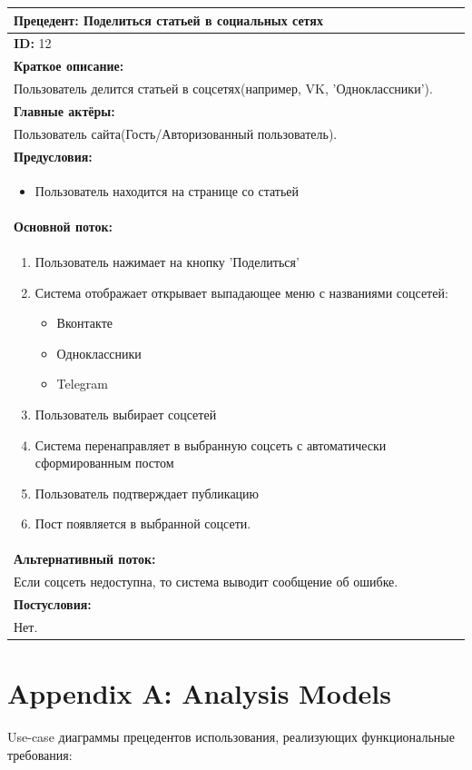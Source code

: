 \documentclass{scrreprt}
\begin{document}
\vspace{10px}
\noindent
\begin{tabularx}{\textwidth}{|X|}
	\hline
	\textbf{Прецедент: Поделиться статьей в социальных сетях} \\
	\hline
	\textbf{ID:} 12 \\
	\hline
	\textbf{Краткое описание:} \\
	Пользователь делится статьей в соцсетях(например, VK, 'Одноклассники').\\
	\hline
	\textbf{Главные актёры:} \\
	Пользователь сайта(Гость/Авторизованный пользователь). \\
	\hline
	\textbf{Предусловия:} \\
	\begin{itemize}[nosep,leftmargin=*]
		\item Пользователь находится на странице со статьей
	\end{itemize} \\
	\hline
	\textbf{Основной поток:} \\
	\begin{enumerate}[nosep,leftmargin=*]
		\item Пользователь нажимает на кнопку 'Поделиться'
		\item Система отображает открывает выпадающее меню с названиями соцсетей:
		\begin{itemize}[]
			\item Вконтакте
			\item Одноклассники
			\item Telegram
		\end{itemize}
		\item Пользователь выбирает соцсетей
		\item Система перенаправляет в выбранную соцсеть с автоматически сформированным постом
		\item Пользователь подтверждает публикацию
		\item Пост появляется в выбранной соцсети.
	\end{enumerate} \\
	\hline
	\textbf{Альтернативный поток:} \\
	Если соцсеть недоступна, то система выводит сообщение об ошибке.\\
	\hline
	\textbf{Постусловия:} \\
	Нет. \\
	\hline
\end{tabularx}

\chapter{Appendix A: Analysis Models}
Use-case диаграммы прецедентов использования, реализующих функциональные требования:
\end{document}
